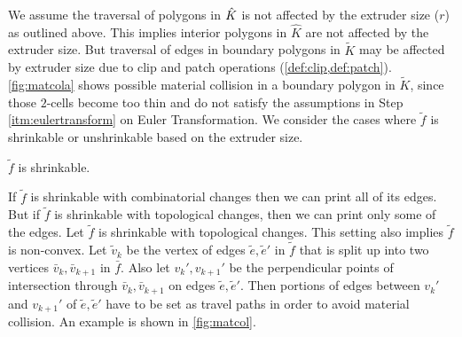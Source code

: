 We assume the traversal of polygons in $\hat{K}$ is not affected by the extruder size ($r$) as outlined above.
This implies interior polygons in $\hat{K}$ are not affected by the extruder size.
But traversal of edges in boundary polygons in $\tilde{K}$ may be affected by extruder size due to clip and patch operations (\cref{def:clip,def:patch}).
\cref{fig:matcola} shows possible material collision in a boundary polygon in $\tilde{K}$, since those $2$-cells become too thin and do not satisfy the assumptions in Step \ref{itm:eulertransform} on Euler Transformation.
We consider the cases where $\tilde{f}$ is shrinkable or unshrinkable based on the extruder size.  

\begin{case}
  $\tilde{f}$ is shrinkable.
\end{case}
 
If $\tilde{f}$ is shrinkable with combinatorial changes then we can print all of its edges.
But if $\tilde{f}$ is shrinkable with topological changes, then we can print only some of the edges.
Let $\tilde{f}$ is shrinkable with topological changes.
This setting also implies $\tilde{f}$ is non-convex.
Let $\tilde{v}_{k}$ be the vertex of edges $\tilde{e}, \tilde{e}'$ in $\tilde{f}$ that is split up into two vertices $\bar{v}_{k}, \bar{v}_{k+1}$ in $\bar{f}$.
Also let $v_{k}', v_{k+1}'$ be the perpendicular points of intersection through $\bar{v}_k, \bar{v}_{k+1}$ on edges $\tilde{e}, \tilde{e}'$.
Then portions of edges between $v_{k}'$ and $v_{k+1}'$ of $\tilde{e}, \tilde{e}'$ have to be set as travel paths in order to avoid material collision.
An example is shown in \cref{fig:matcol}. 

